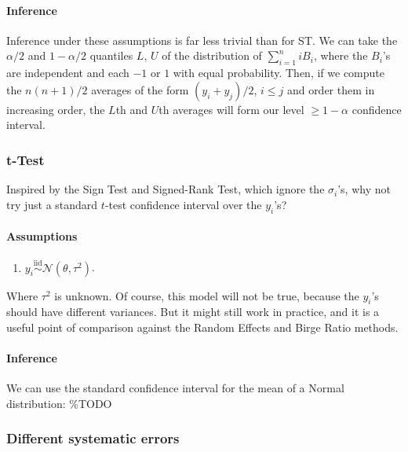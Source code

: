 \documentclass[12pt]{article}
\begin{document}
\paragraph{Inference}\label{inference-4}

Inference under these assumptions is far less trivial than for ST. We can take the $\alpha/2$ and $1-\alpha/2$ quantiles $L$, $U$ of the distribution of $\sum_{i=1}^n iB_i$, where the $B_i$'s are independent and each $-1$ or $1$ with equal probability. Then, if we compute the $n(n+1)/2$ averages of the form $(y_i+y_j)/2$, $i\leq j$ and order them in increasing order, the $L$th and $U$th averages will form our level $\geq 1-\alpha$ confidence interval.

\subsubsection{t-Test}\label{t-test}

Inspired by the Sign Test and Signed-Rank Test, which ignore the $\sigma_i$'s, why not try just a standard $t$-test confidence interval over the $y_i$'s?

\paragraph{Assumptions}\label{assumptions-5}

\begin{enumerate}
\item
  $y_i\overset{\mathrm{iid}}{\sim}\mathcal{N}(\theta,\tau^2)$.
\end{enumerate}

Where $\tau^2$ is unknown. Of course, this model will not be true, because the $y_i$'s should have different variances. But it might still work in practice, and it is a useful point of comparison against the Random Effects and Birge Ratio methods.

\paragraph{Inference}\label{inference-5}

We can use the standard confidence interval for the mean of a Normal distribution:
\%TODO

\subsubsection{Different systematic errors}
\end{document}
